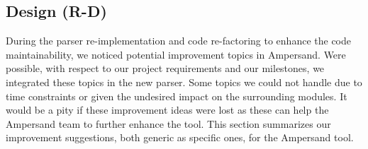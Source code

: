 
\subsection{Design (R-D)}
\label{recommendations:design}
During the parser re-implementation and code re-factoring to enhance the code maintainability, we noticed potential improvement topics in Ampersand.
Were possible, with respect to our project requirements and our milestones, we integrated these topics in the new parser.
Some topics we could not handle due to time constraints or given the undesired impact on the surrounding modules.
It would be a pity if these improvement ideas were lost as these can help the Ampersand team to further enhance the tool.
This section summarizes our improvement suggestions, both generic as specific ones, for the Ampersand tool.

